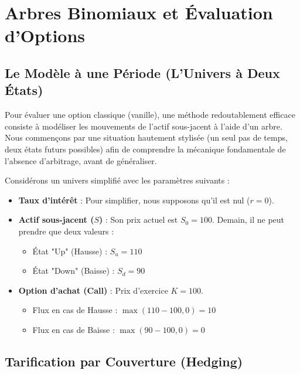 \newpage

\section{Arbres Binomiaux et Évaluation d'Options}

\subsection{Le Modèle à une Période (L'Univers à Deux États)}

\begin{intuitionbox}
Pour évaluer une option classique (vanille), une méthode redoutablement efficace consiste à modéliser les mouvements de l'actif sous-jacent à l'aide d'un arbre. Nous commençons par une situation hautement stylisée (un seul pas de temps, deux états futurs possibles) afin de comprendre la mécanique fondamentale de l'absence d'arbitrage, avant de généraliser.
\end{intuitionbox}

\begin{definitionbox}
Considérons un univers simplifié avec les paramètres suivants :
\begin{itemize}[label=$\rightarrow$]
    \item \textbf{Taux d'intérêt} : Pour simplifier, nous supposons qu'il est nul ($r = 0$).
    \item \textbf{Actif sous-jacent ($S$)} : Son prix actuel est $S_0 = 100$. Demain, il ne peut prendre que deux valeurs :
    \begin{itemize}[label=$\cdot$]
        \item État "Up" (Hausse) : $S_u = 110$
        \item État "Down" (Baisse) : $S_d = 90$
    \end{itemize}
    \item \textbf{Option d'achat (Call)} : Prix d'exercice $K = 100$.
    \begin{itemize}[label=$\cdot$]
        \item Flux en cas de Hausse : $\max(110 - 100, 0) = 10$
        \item Flux en cas de Baisse : $\max(90 - 100, 0) = 0$
    \end{itemize}
\end{itemize}
\end{definitionbox}

\subsection{Tarification par Couverture (Hedging)}

